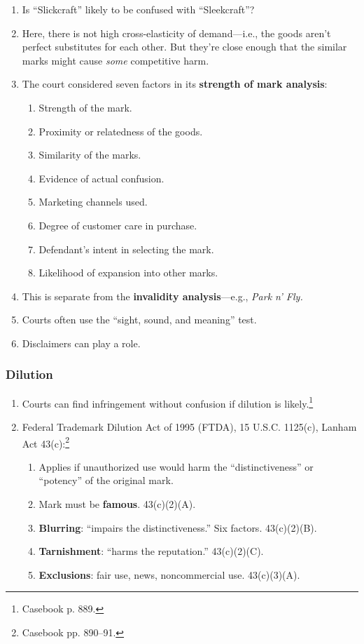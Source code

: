 \begin{enumerate}
    \item Is ``Slickcraft'' likely to be confused with ``Sleekcraft''?
    \item Here, there is not high cross-elasticity of demand---i.e., the goods 
    aren't perfect substitutes for each other. But they're close enough that 
    the similar marks might cause \emph{some} competitive harm.
    \item The court considered seven factors in its \textbf{strength of mark 
    analysis}:
    \begin{enumerate}
        \item Strength of the mark.
        \item Proximity or relatedness of the goods.
        \item Similarity of the marks.
        \item Evidence of actual confusion.
        \item Marketing channels used.
        \item Degree of customer care in purchase.
        \item Defendant's intent in selecting the mark.
        \item Likelihood of expansion into other marks.
    \end{enumerate}
    \item This is separate from the \textbf{invalidity analysis}---e.g., 
    \emph{Park n' Fly.}
    \item Courts often use the ``sight, sound, and meaning'' test.
    \item Disclaimers can play a role.
\end{enumerate}

\subsubsection{Dilution}

\begin{enumerate}
    \item Courts can find infringement without confusion if dilution is 
    likely.\footnote{Casebook p. 889.}
    \item Federal Trademark Dilution Act of 1995 (FTDA), 15 U.S.C. 1125(c), 
    Lanham Act 43(c):\footnote{Casebook pp. 890--91.}
    \begin{enumerate}
        \item Applies if unauthorized use would harm the ``distinctiveness'' 
        or ``potency'' of the original mark.
        \item Mark must be \textbf{famous}. 43(c)(2)(A).
        \item \textbf{Blurring}: ``impairs the distinctiveness.'' Six factors. 
        43(c)(2)(B).
        \item \textbf{Tarnishment}: ``harms the reputation.'' 43(c)(2)(C).
        \item \textbf{Exclusions}: fair use, news, noncommercial use. 
        43(c)(3)(A).  \end{enumerate}
\end{enumerate}

